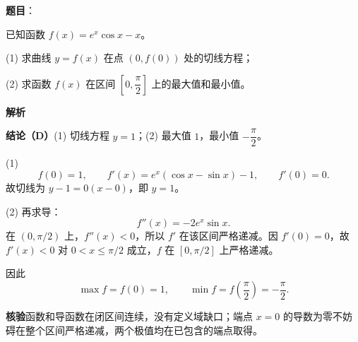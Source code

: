 \begin{answer}

\textbf{题目}：

已知函数 $f(x)=e^x\cos x-x$。

(1)   求曲线 $y=f(x)$ 在点 $(0,f(0))$ 处的切线方程；

(2)   求函数 $f(x)$ 在区间 $\left[0,\dfrac\pi2\right]$ 上的最大值和最小值。

\textbf{解析}

\textbf{结论（D）}(1) 切线方程 $y=1$；(2) 最大值 $1$，最小值 $-\dfrac\pi2$。

(1)
\nopagebreak[4]
\[
f(0)=1,\qquad f'(x)=e^x(\cos x-\sin x)-1,\qquad f'(0)=0.
\]
故切线为 $y-1=0(x-0)$，即 $y=1$。

(2) 再求导：
\nopagebreak[4]
\[
f''(x)=-2e^x\sin x.
\]
在 $(0,\pi/2)$ 上，$f''(x)<0$，所以 $f'$ 在该区间严格递减。因 $f'(0)=0$，故 $f'(x)<0$ 对 $0<x\leqslant\pi/2$ 成立，$f$ 在 $[0,\pi/2]$ 上严格递减。

因此
\nopagebreak[4]
\[
\max f=f(0)=1,\qquad
\min f=f\left(\frac\pi2\right)=-\frac\pi2.
\]

\textbf{核验}函数和导函数在闭区间连续，没有定义域缺口；端点 $x=0$ 的导数为零不妨碍在整个区间严格递减，两个极值均在已包含的端点取得。



\end{answer}